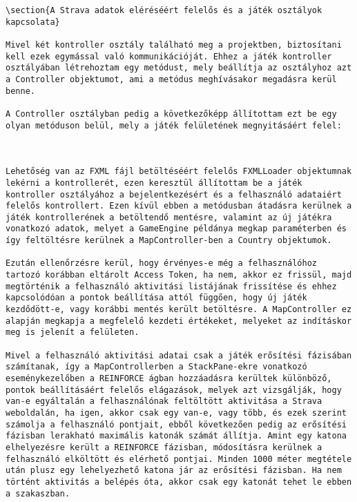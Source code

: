 \begin{verbatim}
\section{A Strava adatok eléréséért felelős és a játék osztályok kapcsolata}

Mivel két kontroller osztály található meg a projektben, biztosítani kell ezek egymással való kommunikációját. Ehhez a játék kontroller osztályában létrehoztam egy metódust, mely beállítja az osztályhoz azt a Controller objektumot, ami a metódus meghívásakor megadásra kerül benne. 

A Controller osztályban pedig a következőképp állítottam ezt be egy olyan metóduson belül, mely a játék felületének megnyitásáért felel: 

 

Lehetőség van az FXML fájl betöltéséért felelős FXMLLoader objektumnak lekérni a kontrollerét, ezen keresztül állítottam be a játék kontroller osztályához a bejelentkezésért és a felhasználó adataiért felelős kontrollert. Ezen kívül ebben a metódusban átadásra kerülnek a játék kontrollerének a betöltendő mentésre, valamint az új játékra vonatkozó adatok, melyet a GameEngine példánya megkap paraméterben és így feltöltésre kerülnek a MapController-ben a Country objektumok. 

Ezután ellenőrzésre kerül, hogy érvényes-e még a felhasználóhoz tartozó korábban eltárolt Access Token, ha nem, akkor ez frissül, majd megtörténik a felhasználó aktivitási listájának frissítése és ehhez kapcsolódóan a pontok beállítása attól függően, hogy új játék kezdődött-e, vagy korábbi mentés került betöltésre. A MapController ez alapján megkapja a megfelelő kezdeti értékeket, melyeket az indításkor meg is jelenít a felületen. 

Mivel a felhasználó aktivitási adatai csak a játék erősítési fázisában számítanak, így a MapControllerben a StackPane-ekre vonatkozó eseménykezelőben a REINFORCE ágban hozzáadásra kerültek különböző, pontok beállításáért felelős elágazások, melyek azt vizsgálják, hogy van-e egyáltalán a felhasználónak feltöltött aktivitása a Strava weboldalán, ha igen, akkor csak egy van-e, vagy több, és ezek szerint számolja a felhasználó pontjait, ebből következően pedig az erősítési fázisban lerakható maximális katonák számát állítja. Amint egy katona elhelyezésre került a REINFORCE fázisban, módosításra kerülnek a felhasználó elköltött és elérhető pontjai. Minden 1000 méter megtétele után plusz egy lehelyezhető katona jár az erősítési fázisban. Ha nem történt aktivitás a belépés óta, akkor csak egy katonát tehet le ebben a szakaszban. 


\end{verbatim}
